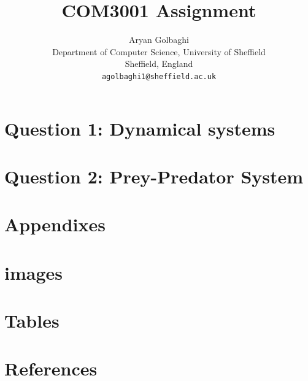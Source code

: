\documentclass[10pt]{article}
\title{COM3001 Assignment}
\author{Aryan Golbaghi \\
Department of Computer Science, University of Sheffield \\
Sheffield, England \\
\texttt{agolbaghi1@sheffield.ac.uk}}
\begin{document}
\maketitle
\newpage

\section{Question 1: Dynamical systems}



\section{Question 2: Prey-Predator System}







\newpage
\clearpage
\section{Appendixes}
\appendix



\newpage
\clearpage

\section{images}


\newpage
\clearpage

\section{Tables}



\newpage
\clearpage

\section{References}
 
 
\end{document}
